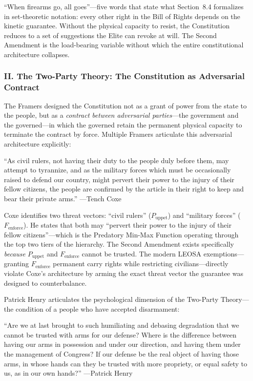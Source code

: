 \documentclass[12pt,openany]{book}
\begin{document}
``When firearms go, all goes''---five words that state what Section~8.4 formalizes in set-theoretic notation: every other right in the Bill of Rights depends on the kinetic guarantee. Without the physical capacity to resist, the Constitution reduces to a set of suggestions the Elite can revoke at will. The Second Amendment is the load-bearing variable without which the entire constitutional architecture collapses.

\subsubsection*{II. The Two-Party Theory: The Constitution as Adversarial Contract}

The Framers designed the Constitution not as a grant of power from the state to the people, but as a \textit{contract between adversarial parties}---the government and the governed---in which the governed retain the permanent physical capacity to terminate the contract by force. Multiple Framers articulate this adversarial architecture explicitly:

\begin{historicalsource}
``As civil rulers, not having their duty to the people duly before them, may attempt to tyrannize, and as the military forces which must be occasionally raised to defend our country, might pervert their power to the injury of their fellow citizens, the people are confirmed by the article in their right to keep and bear their private arms.'' \hfill ---Tench Coxe
\end{historicalsource}

Coxe identifies two threat vectors: ``civil rulers'' ($P_{\text{uppet}}$) and ``military forces'' ($F_{\text{enforce}}$). He states that both may ``pervert their power to the injury of their fellow citizens''---which is the Predatory Min-Max Function operating through the top two tiers of the hierarchy. The Second Amendment exists specifically \textit{because} $P_{\text{uppet}}$ and $F_{\text{enforce}}$ cannot be trusted. The modern LEOSA exemptions---granting $F_{\text{enforce}}$ permanent carry rights while restricting civilians---directly violate Coxe's architecture by arming the exact threat vector the guarantee was designed to counterbalance.

Patrick Henry articulates the psychological dimension of the Two-Party Theory---the condition of a people who have accepted disarmament:

\begin{historicalsource}
``Are we at last brought to such humiliating and debasing degradation that we cannot be trusted with arms for our defense? Where is the difference between having our arms in possession and under our direction, and having them under the management of Congress? If our defense be the real object of having those arms, in whose hands can they be trusted with more propriety, or equal safety to us, as in our own hands?'' \hfill ---Patrick Henry
\end{historicalsource}
\end{document}
